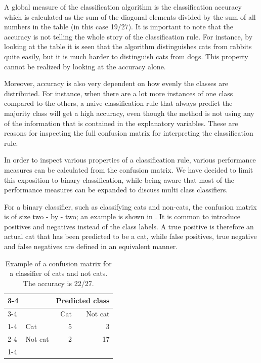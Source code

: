 A global measure of the classification algorithm is the classification accuracy which is calculated as the sum of the diagonal elements divided by the sum of all numbers in the table (in this case 19/27).  
It is important to note that the accuracy is not telling the whole story of the classification rule.  
For instance, by looking at the table it is seen that the algorithm distinguishes cats from rabbits quite easily, but it is much harder to distinguish cats from dogs.  This property cannot be realized by looking at the accuracy alone.  

Moreover, accuracy is also very dependent on how evenly the classes are distributed.   For instance, when there are a lot more instances of one class compared to the others, a naive classification rule that always predict the majority class will get a high accuracy, even though the method is not using any of the information that is contained in the explanatory variables.  
These are reasons for inspecting the full confusion matrix for interpreting the classification rule.  

In order to inspect various properties of a classification rule, various performance measures can be calculated from the confusion matrix.  We have decided to limit this exposition to binary classification, while being aware that most of the performance measures can be expanded to discuss multi class classifiers.

For a binary classifier, such as classifying cats and non-cats, the confusion matrix is of size two - by - two; an example is shown in .  
It is common to introduce positives and negatives  instead of the class labels.  
A true positive is therefore an actual cat that has been predicted to be a cat, while false positives, true negative and false negatives are defined in an equivalent manner.  


\vspace{1ex}
\begin{table}[ht]
\centering
\begin{tabular}{ll|r|r|}
\cline{3-4}
&&  \multicolumn{2}{c|}{Predicted class}\\
\cline{3-4}
&& Cat & Not cat\\ 
\cline{1-4}
\multicolumn{1}{ |c| }{\multirow{3}{*}{Actual class} }
& Cat & 5 & 3\\
\cline{2-4}
\multicolumn{1}{ |c| }{} & Not cat & 2 & 17 \\
\cline{1-4}
\end{tabular}
\caption{Example of a confusion matrix for a classifier of cats and not cats. The accuracy is 22/27.}
\label{tab:binary}
\end{table}
\vspace{1ex}

